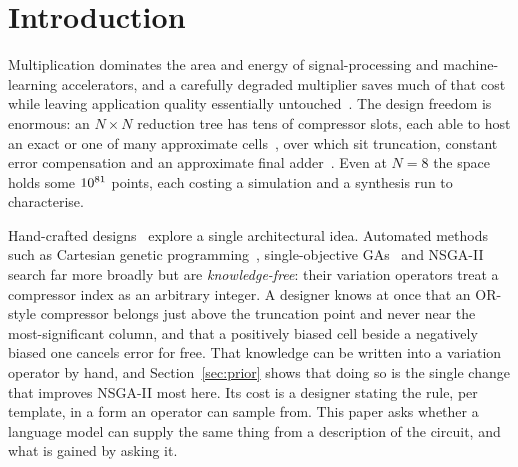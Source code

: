 \documentclass[acmsmall,review,anonymous]{acmart}
\begin{document}


\maketitle

\section{Introduction}
Multiplication dominates the area and energy of signal-processing and
machine-learning accelerators, and a carefully degraded multiplier saves much
of that cost while leaving application quality essentially
untouched~\cite{han2013,jiang2020,wu2023survey}.  The design freedom is
enormous: an $N\times N$ reduction tree has tens of compressor slots, each able
to host an exact or one of many approximate
cells~\cite{momeni2015,akbari2017,strollo2020}, over which sit truncation,
constant error compensation and an approximate final adder~\cite{mahdiani2010}.
Even at $N=8$ the space holds some $10^{81}$ points, each costing a
simulation and a synthesis run to characterise.

Hand-crafted designs~\cite{kulkarni2011,hashemi2015,mitchell1962} explore a
single architectural idea.  Automated methods such as Cartesian genetic
programming~\cite{vasicek2015}, single-objective GAs~\cite{wen2025} and
NSGA-II~\cite{devi2025} search far more broadly but are \emph{knowledge-free}:
their variation operators treat a compressor index as an arbitrary integer.  A
designer knows at once that an OR-style compressor belongs just above the
truncation point and never near the most-significant column, and that a
positively biased cell beside a negatively biased one cancels error for free.
That knowledge can be written into a variation operator by hand, and
Section~\ref{sec:prior} shows that doing so is the single change that improves
NSGA-II most here.  Its cost is a designer stating the rule, per template, in a
form an operator can sample from.  This paper asks whether a language model can
supply the same thing from a description of the circuit, and what is gained by
asking it.
\end{document}
